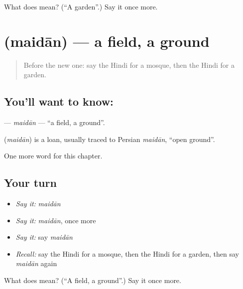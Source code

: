 \begin{tcolorbox}[breakable,colback=teal!4,colframe=teal!35!black,title={Before you move on}]
What does  mean? (\textquotedblleft{}A garden\textquotedblright{}.) Say it once more.
\end{tcolorbox}
\section[\texorpdfstring{\hi{मैदान} (maidān)}{मैदान (maidān)}]{ (maidān) — a field, a ground}

\label{lesson:HI-C153-maidan}



\begin{quote}
Before the new one: say the Hindi for a mosque, then the Hindi for a garden.
\end{quote}

\subsection*{You'll want to know: }
\textbf{} — \emph{maidān} — \textquotedblleft{}a field, a ground\textquotedblright{}.

\begin{cousinweb}
\textbf{} (\emph{maidān}) is a loan, usually traced to Persian \emph{maidān}, \textquotedblleft{}open ground\textquotedblright{}.
\end{cousinweb}

\begin{grammarlens}[title={What you've built}]
One more word for this chapter.
\end{grammarlens}

\subsection*{Your turn}
\begin{itemize}
\raggedright
  \item \emph{Say it:} \emph{maidān}
  \item \emph{Say it:} \emph{maidān}, once more
  \item \emph{Say it:} say \emph{maidān}
  \item \emph{Recall:} say the Hindi for a mosque, then the Hindi for a garden, then say \emph{maidān} again
\end{itemize}

\begin{tcolorbox}[breakable,colback=teal!4,colframe=teal!35!black,title={Before you move on}]
What does  mean? (\textquotedblleft{}A field, a ground\textquotedblright{}.) Say it once more.
\end{tcolorbox}
